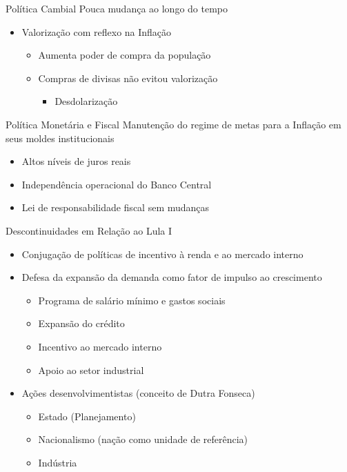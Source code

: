 \documentclass[presentation]{beamer}
\begin{document}
\begin{frame}[label={sec:org0158148}]{Política Cambial}
Pouca mudança ao longo do tempo
\begin{itemize}
\item Valorização com reflexo na Inflação
\begin{itemize}
\item Aumenta poder de compra da população
\item Compras de divisas não evitou valorização
\begin{itemize}
\item Desdolarização
\end{itemize}
\end{itemize}
\end{itemize}
\end{frame}

\begin{frame}[label={sec:org225a311}]{Política Monetária e Fiscal}
Manutenção do regime de metas para a Inflação em seus moldes institucionais
\begin{itemize}
\item Altos níveis de juros reais
\end{itemize}
\begin{itemize}
\item Independência operacional do Banco Central
\item Lei de responsabilidade fiscal sem mudanças
\end{itemize}
\end{frame}

\begin{frame}[label={sec:orgfd05a94}]{Descontinuidades em Relação ao Lula I}
\begin{itemize}
\item Conjugação de políticas de incentivo à renda e ao mercado interno
\item Defesa da expansão da demanda como fator de impulso ao crescimento
\begin{itemize}
\item Programa de salário mínimo e gastos sociais
\item Expansão do crédito
\item Incentivo ao mercado interno
\item Apoio ao setor industrial
\end{itemize}
\item Ações desenvolvimentistas (conceito de Dutra Fonseca)
\begin{itemize}
\item Estado (Planejamento)
\item Nacionalismo (nação como unidade de referência)
\item Indústria
\end{itemize}
\end{itemize}
\end{frame}
\end{document}
